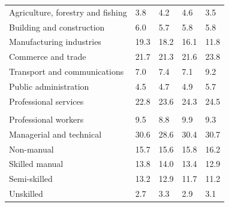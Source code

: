 \documentclass{article}
\begin{document}
\begin{table}[h]
\begin{tabular}{KTTTT}
    \hline
Agriculture, forestry and fishing  & 3.8& 4.2& 4.6& 3.5\\
Building and construction & 6.0& 5.7& 5.8& 5.8\\
Manufacturing industries & 19.3& 18.2& 16.1& 11.8\\
Commerce and trade  & 21.7& 21.3& 21.6& 23.8\\
Transport and communications  & 7.0& 7.4& 7.1& 9.2\\
Public administration & 4.5& 4.7& 4.9& 5.7\\
Professional services & 22.8& 23.6& 24.3& 24.5\\
\hline
    \\ 
    \hline
Professional workers  & 9.5& 8.8 & 9.9& 9.3\\
Managerial and technical & 30.6& 28.6& 30.4& 30.7\\
Non-manual & 15.7& 15.6& 15.8& 16.2\\
Skilled manual & 13.8& 14.0& 13.4& 12.9\\
Semi-skilled & 13.2& 12.9& 11.7& 11.2\\
Unskilled  & 2.7& 3.3& 2.9& 3.1\\
\end{tabular}
\end{table}
\pagebreak
\end{document}
